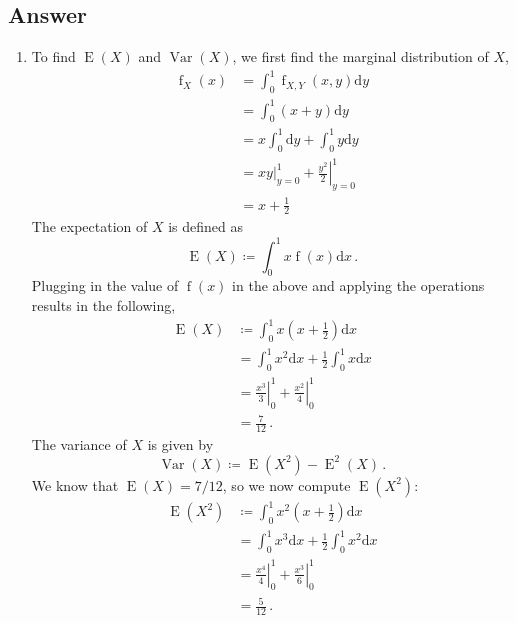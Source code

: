 \documentclass[12pt]{fphw}
\newcommand{\var}{\operatorname{Var}}
\newcommand{\expect}{\operatorname{E}}
\newcommand{\eval}[3]{\left. #1 \right\vert_{#2}^{#3}}
\begin{document}
\subsection*{Answer}
\begin{enumerate} %
	\item To find $\expect(X)$ and $\var(X)$, we first find the marginal distribution of $X$,	
	\begin{align}
		\operatorname{f}_{X}(x)
			&= \int_{0}^{1} \operatorname{f}_{X,Y}(x,y) \mathrm{d}y\\
			&= \int_{0}^{1} (x+y) \mathrm{d}y\\
			&= x \int_{0}^{1} \mathrm{d}y + \int_{0}^{1} y \mathrm{d}y\\
			&= x \eval{y}{y=0}{1} + \eval{\frac{y^2}{2}}{y=0}{1}\\
			&= x+\frac{1}{2}
	\end{align}
	The expectation of $X$ is defined as
	\begin{equation}
		\expect(X) \coloneqq \int_{0}^{1} x \operatorname{f}(x) \mathrm{d}x\,.
	\end{equation}
	Plugging in the value of $\operatorname{f}(x)$ in the above and applying the operations results in the following,
	\begin{align}
		\expect(X)
			&\coloneqq \int_{0}^{1} x \left(x+\frac{1}{2}\right) \mathrm{d}x\\
			&=\int_{0}^{1} x^2 \mathrm{d}x + \frac{1}{2} \int_{0}^{1} x \mathrm{d}x\\
			&=\eval{\frac{x^3}{3}}{0}{1} + \eval{\frac{x^2}{4}}{0}{1}\\
			&=\frac{7}{12}\,.
	\end{align}
	The variance of $X$ is given by
	\begin{equation}
		\var(X) \coloneqq \expect(X^2) - \expect^2(X)\,.
	\end{equation}
	We know that $\expect(X) = 7/12$, so we now compute $\expect(X^2)$:
	\begin{align}
		\expect(X^2)
			&\coloneqq \int_{0}^{1} x^2 \left(x+\frac{1}{2}\right) \mathrm{d}x\\
			&=\int_{0}^{1} x^3 \mathrm{d}x + \frac{1}{2} \int_{0}^{1} x^2 \mathrm{d}x\\
			&=\eval{\frac{x^4}{4}}{0}{1} + \eval{\frac{x^3}{6}}{0}{1}\\
			&=\frac{5}{12}\,.
	\end{align}
	

\end{enumerate}
\end{document}
